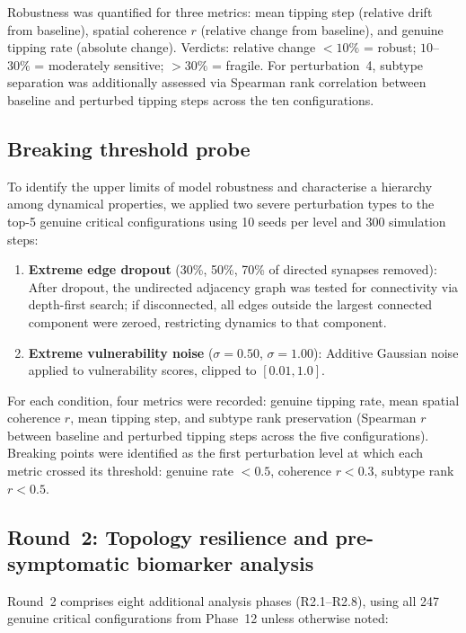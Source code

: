 \documentclass[12pt,a4paper]{article}
\begin{document}
Robustness was quantified for three metrics: mean tipping step (relative drift from baseline),
spatial coherence $r$ (relative change from baseline), and genuine tipping rate (absolute
change). Verdicts: relative change $< 10\%$ = robust; $10$--$30\%$ = moderately sensitive;
$> 30\%$ = fragile. For perturbation~4, subtype separation was additionally assessed via
Spearman rank correlation between baseline and perturbed tipping steps across the ten
configurations.

\subsection{Breaking threshold probe}

To identify the upper limits of model robustness and characterise a hierarchy among dynamical
properties, we applied two severe perturbation types to the top-5 genuine critical
configurations using 10 seeds per level and 300 simulation steps:

\begin{enumerate}
\item \textbf{Extreme edge dropout} (30\%, 50\%, 70\% of directed synapses removed): After
dropout, the undirected adjacency graph was tested for connectivity via depth-first search; if
disconnected, all edges outside the largest connected component were zeroed, restricting
dynamics to that component.
\item \textbf{Extreme vulnerability noise} ($\sigma = 0.50$, $\sigma = 1.00$): Additive
Gaussian noise applied to vulnerability scores, clipped to $[0.01, 1.0]$.
\end{enumerate}

For each condition, four metrics were recorded: genuine tipping rate, mean spatial coherence
$r$, mean tipping step, and subtype rank preservation (Spearman $r$ between baseline and
perturbed tipping steps across the five configurations). Breaking points were identified as the
first perturbation level at which each metric crossed its threshold: genuine rate $< 0.5$,
coherence $r < 0.3$, subtype rank $r < 0.5$.

\subsection{Round~2: Topology resilience and pre-symptomatic biomarker analysis}

Round~2 comprises eight additional analysis phases (R2.1--R2.8), using all 247 genuine
critical configurations from Phase~12 unless otherwise noted:
\end{document}
